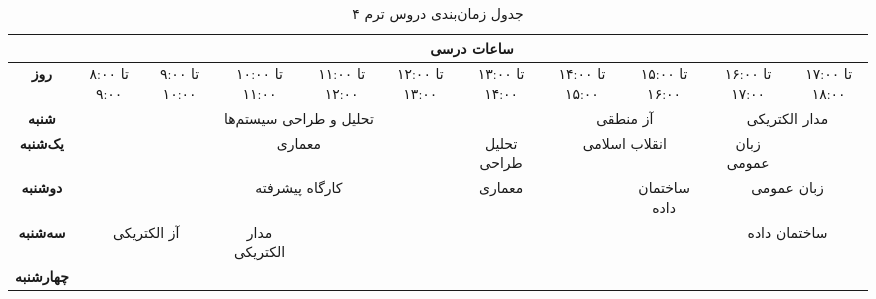\documentclass{article}
\begin{document}
	
	\begin{sidewaystable}[h]
		\begin{center}	
			\caption{جدول زمان‌بندی دروس ترم ۴}	
			\begin{tabular}{|c|c|c|c|c|c|c|c|c|c|c|}
				\cline{2-11}
				\multicolumn{1}{c}{}
				& \multicolumn{10}{|c|}{\textbf{ساعات درسی}} \\ \hline
				\textbf{روز} & ۸:۰۰	 تا ۹:۰۰ & ۹:۰۰ تا ۱۰:۰۰ &
				۱۰:۰۰ تا ۱۱:۰۰ & ۱۱:۰۰ تا ۱۲:۰۰ &
				۱۲:۰۰ تا ۱۳:۰۰ & ۱۳:۰۰ تا ۱۴:۰۰ &
				۱۴:۰۰ تا ۱۵:۰۰ & ۱۵:۰۰ تا ۱۶:۰۰ &
				۱۶:۰۰ تا ۱۷:۰۰ & ۱۷:۰۰ تا ۱۸:۰۰ \\
				\hline
				\hline
				
				\textbf{شنبه} &
				\multicolumn{2}{|c|}{} &
				\multicolumn{2}{|c|}{تحلیل و طراحی سیستم‌ها} &
				\multicolumn{2}{|c|}{} &
				\multicolumn{2}{|c|}{آز منطقی} &
				\multicolumn{2}{|c|}{مدار‌ الکتریکی} \\
				\hline
				
				\textbf{یک‌شنبه} &
				\multicolumn{2}{|c|}{} &
				\multicolumn{2}{|c|}{معماری} &
				& تحلیل طراحی &
				\multicolumn{2}{|c|}{انقلاب اسلامی} &
				زبان عمومی & \\
				\hline
				
				\textbf{دوشنبه} &
				\multicolumn{2}{|c|}{} &
				\multicolumn{2}{|c|}{کارگاه پیشرفته} &
				& معماری &
				 & ساختمان داده &
				\multicolumn{2}{|c|}{زبان عمومی} \\
				\hline
				
				\textbf{سه‌شنبه} &
				\multicolumn{2}{|c|}{آز الکتریکی} &
				مدار الکتریکی & &
				\multicolumn{2}{|c|}{} &
				\multicolumn{2}{|c|}{} &
				\multicolumn{2}{|c|}{ساختمان داده} \\
				\hline
				
				\textbf{چهارشنبه} &
				\multicolumn{2}{|c|}{} &
				\multicolumn{2}{|c|}{} &
				\multicolumn{2}{|c|}{} &
				\multicolumn{2}{|c|}{} &
				\multicolumn{2}{|c|}{} \\
				\hline
			\end{tabular}
		\end{center}
	\end{sidewaystable}
\end{document}
